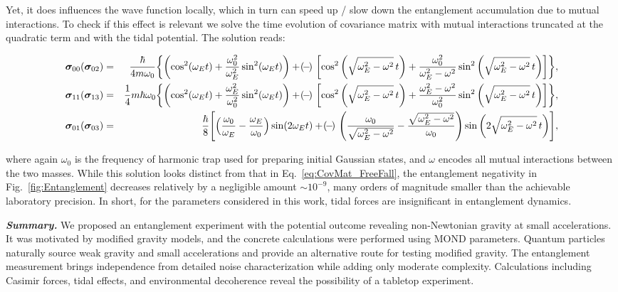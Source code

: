 \documentclass[aps,prd,reprint,superscriptaddress,nofootinbib,floatfix]{revtex4-2}
\begin{document}
Yet, it does influences the wave function locally, which in turn can speed up / slow down the entanglement accumulation due to mutual interactions. 
To check if this effect is relevant we solve the time evolution of covariance matrix with mutual interactions truncated at the quadratic term and with the tidal potential.
The solution reads:
\begin{widetext}
\begin{eqnarray}
\bm{\sigma}_{00}(\bm{\sigma}_{02})
&=&	\frac{\hbar}{4m\omega_{0}} \qty{
\qty( \cos^{2}(\omega_{E}t)+\frac{\omega_{0}^{2}}{\omega_{E}^{2}}\sin^{2}(\omega_{E}t) )
+\!(\!-\!) \
 \qty[ \cos^2\qty(\sqrt{\omega_E^2-\omega^2} \, t) + \frac{\omega_0^2}{\omega_E^2-\omega^2} \sin^2\qty(\sqrt{\omega_E^2-\omega^2} \, t) ]
}, 
\nonumber \\
\bm{\sigma}_{11}(\bm{\sigma}_{13})
&=& \frac{1}{4}m\hbar\omega_{0} 
\qty{
\qty( \cos^{2}(\omega_{E}t)+\frac{\omega_{E}^{2}}{\omega_{0}^{2}}\sin^{2}(\omega_{E}t) )
+\!(\!-\!) \
\qty[ \cos^2\qty(\sqrt{\omega_E^2-\omega^2} \, t) + \frac{\omega_E^2-\omega^2}{\omega_0^2} \sin^2\qty(\sqrt{\omega_E^2-\omega^2} \, t) ]
},
\nonumber \\
\bm{\sigma}_{01}(\bm{\sigma}_{03})
&=&	\frac{\hbar}{8}  
\Bigg[
\Big(\frac{\omega_{0}}{\omega_{E}}-\frac{\omega_{E}}{\omega_{0}}\Big)\sin(2\omega_{E}t)
+\!(\!-\!) \
\qty( \frac{\omega_0}{\sqrt{\omega_E^2-\omega^2}}  - \frac{\sqrt{\omega_E^2-\omega^2}}{\omega_0} ) \sin\qty(2\sqrt{\omega_E^2-\omega^2} \, t)
\Bigg],
\label{eq:CovMat_FreeFall_Tidal}
\end{eqnarray}
\end{widetext}
where again $\omega_0$ is the frequency of harmonic trap used for preparing initial Gaussian states, and $\omega$ encodes all mutual interactions between the two masses. While this solution looks distinct from that in Eq.~\eqref{eq:CovMat_FreeFall}, the entanglement negativity in Fig.~\ref{fig:Entanglement} decreases relatively by a negligible amount $\sim 10^{-9}$, many orders of magnitude smaller than the achievable laboratory precision. In short, for the parameters considered in this work, tidal forces are insignificant in entanglement dynamics.



\emph{\textbf{Summary.}}
We proposed an entanglement experiment 
with the potential outcome revealing non-Newtonian gravity at small accelerations. 
It was motivated by modified gravity models, and the concrete calculations were performed using MOND parameters. 
Quantum particles naturally source weak gravity and small accelerations and provide an alternative route for testing modified gravity. The entanglement measurement brings independence from detailed noise characterization while adding only moderate complexity. Calculations including Casimir forces, tidal effects, and environmental decoherence reveal the possibility of a tabletop experiment.
\end{document}
